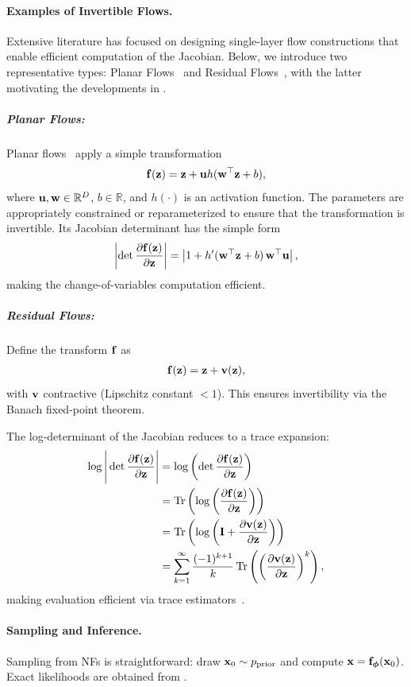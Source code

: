 \paragraph{Examples of Invertible Flows.} Extensive literature has focused on designing single-layer flow constructions that enable efficient computation of the Jacobian. Below, we introduce two representative types: Planar Flows~\citep{rezende2015variational} and Residual Flows~\citep{chen2019residual,behrmann2019invertible}, with the latter motivating the developments in .
\subparagraph{Planar Flows:}
Planar flows~\citep{rezende2015variational} apply a simple transformation
\[
{\mathbf{f}}({\mathbf{z}})
=
{\mathbf{z}}
+
{\mathbf{u}} h({\mathbf{w}}^\top{\mathbf{z}}+b),
\]
where ${\mathbf{u}},{\mathbf{w}}\in\mathbb{R}^D$, $b\in\mathbb{R}$, and $h(\cdot)$ is an
activation function. The parameters are appropriately constrained or
reparameterized to ensure that the transformation is invertible. Its Jacobian
determinant has the simple form
\[
\left|
\det\frac{\partial{\mathbf{f}}({\mathbf{z}})}{\partial{\mathbf{z}}}
\right|
=
\left|
1+h'({\mathbf{w}}^\top{\mathbf{z}}+b)\,{\mathbf{w}}^\top{\mathbf{u}}
\right|,
\]
making the change-of-variables computation efficient.

\subparagraph{Residual Flows:}
Define the transform ${\mathbf{f}}$ as
\begin{align}\label{eq:residual-flow}
{\mathbf{f}}({\mathbf{z}}) = {\mathbf{z}} + {\mathbf{v}}({\mathbf{z}}),
\end{align}
with ${\mathbf{v}}$ contractive (Lipschitz constant $< 1$). This ensures invertibility via the Banach fixed-point theorem.

The log-determinant of the Jacobian reduces to a trace expansion:
\begin{align}\label{eq:log-det-tr}
    \log \Bigg|\det \frac{\partial {\mathbf{f}}({\mathbf{z}})}{\partial {\mathbf{z}}} \Bigg| &= \log \left( \det \frac{\partial {\mathbf{f}}({\mathbf{z}})}{\partial {\mathbf{z}}} \right) \nonumber\\
    &= \operatorname{Tr}\left(\log\left(\frac{\partial {\mathbf{f}}({\mathbf{z}})}{\partial {\mathbf{z}}}\right)\right) \nonumber\\
    &= \operatorname{Tr}\left(\log\left({\mathbf{I}} + \frac{\partial {\mathbf{v}}({\mathbf{z}})}{\partial {\mathbf{z}}}\right)\right) \nonumber\\
    &= \sum_{k=1}^{\infty} \frac{(-1)^{k+1}}{k} \operatorname{Tr}\left(\left(\frac{\partial {\mathbf{v}}({\mathbf{z}})}{\partial {\mathbf{z}}}\right)^k\right),
\end{align}
making evaluation efficient via trace estimators~\citep{hutchinson1989stochastic}.

\paragraph{Sampling and Inference.}
Sampling from NFs is straightforward: draw ${\mathbf{x}}_0 \sim p_{\text{prior}}$ and compute ${\mathbf{x}} = {\mathbf{f}}_{\bm{\phi}}({\mathbf{x}}_0)$. Exact likelihoods are obtained from .


